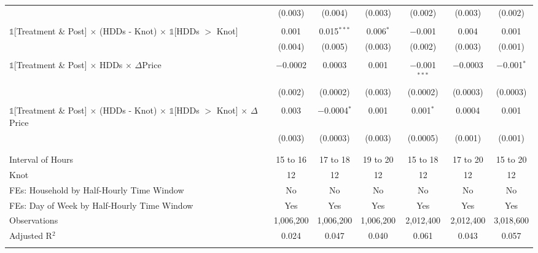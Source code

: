 \begin{table}[!htbp]
\begin{longtable}{@{\extracolsep{15pt}}lcccccc}
  & (0.003) & (0.004) & (0.003) & (0.002) & (0.003) & (0.002) \\ 
  & & & & & & \\ 
 $\mathbb{1}$[Treatment \& Post] $\times$ (HDDs - Knot) $\times$ $\mathbb{1}$[HDDs $>$ Knot] & 0.001 & 0.015$^{***}$ & 0.006$^{*}$ & $-$0.001 & 0.004 & 0.001 \\ 
  & (0.004) & (0.005) & (0.003) & (0.002) & (0.003) & (0.001) \\ 
  & & & & & & \\ 
 $\mathbb{1}$[Treatment \& Post] $\times$ HDDs $\times$ $\Delta$Price & $-$0.0002 & 0.0003 & 0.001 & $-$0.001$^{***}$ & $-$0.0003 & $-$0.001$^{*}$ \\ 
  & (0.002) & (0.0002) & (0.003) & (0.0002) & (0.0003) & (0.0003) \\ 
  & & & & & & \\ 
 $\mathbb{1}$[Treatment \& Post] $\times$ (HDDs - Knot) $\times$ $\mathbb{1}$[HDDs $>$ Knot] $\times$ $\Delta$Price & 0.003 & $-$0.0004$^{*}$ & 0.001 & 0.001$^{*}$ & 0.0004 & 0.001 \\ 
  & (0.003) & (0.0003) & (0.003) & (0.0005) & (0.001) & (0.001) \\ 
  & & & & & & \\ 
\hline \\[-1.8ex] 
Interval of Hours & 15 to 16 & 17 to 18 & 19 to 20 & 15 to 18 & 17 to 20 & 15 to 20 \\ 
Knot & 12 & 12 & 12 & 12 & 12 & 12 \\ 
FEs: Household by Half-Hourly Time Window & No & No & No & No & No & No \\ 
FEs: Day of Week by Half-Hourly Time Window & Yes & Yes & Yes & Yes & Yes & Yes \\ 
Observations & 1,006,200 & 1,006,200 & 1,006,200 & 2,012,400 & 2,012,400 & 3,018,600 \\ 
Adjusted R$^{2}$ & 0.024 & 0.047 & 0.040 & 0.061 & 0.043 & 0.057 \\ 
\hline 
\hline \\[-1.8ex] 
\end{longtable} 
\end{table} 
